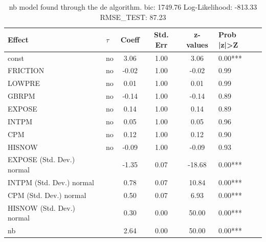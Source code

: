 \begin{table}
	\caption{nb model found through the de algorithm. bic: 1749.76 Log-Likelihood: -813.33 RMSE_TEST: 87.23}
	\begin{center}
		\begin{tabular}{|l|l|c|c|c|l|}
			\hline
			Effect & $\tau$ & Coeff & Std. Err & z-values & Prob |z|>Z \\
			\hline
			const & no & 3.06 & 1.00 & 3.06 & 0.00*** \\
			\hline
			FRICTION & no & -0.02 & 1.00 & -0.02 & 0.99 \\
			\hline
			LOWPRE & no & 0.01 & 1.00 & 0.01 & 0.99 \\
			\hline
			GBRPM & no & -0.14 & 1.00 & -0.14 & 0.89 \\
			\hline
			EXPOSE & no & 0.14 & 1.00 & 0.14 & 0.89 \\
			\hline
			INTPM & no & 0.05 & 1.00 & 0.05 & 0.96 \\
			\hline
			CPM & no & 0.12 & 1.00 & 0.12 & 0.90 \\
			\hline
			HISNOW & no & -0.09 & 1.00 & -0.09 & 0.93 \\
			\hline
			EXPOSE (Std. Dev.) normal &  & -1.35 & 0.07 & -18.68 & 0.00*** \\
			\hline
			INTPM (Std. Dev.) normal &  & 0.78 & 0.07 & 10.84 & 0.00*** \\
			\hline
			CPM (Std. Dev.) normal &  & 0.50 & 0.07 & 6.93 & 0.00*** \\
			\hline
			HISNOW (Std. Dev.) normal &  & 0.30 & 0.00 & 50.00 & 0.00*** \\
			\hline
			nb &  & 2.64 & 0.00 & 50.00 & 0.00*** \\
			\hline
		\end{tabular}
	\end{center}
\end{table}